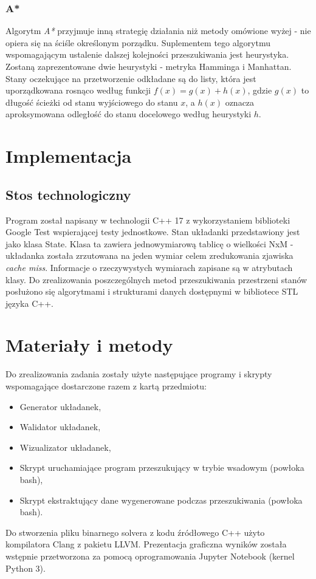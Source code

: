 \documentclass{classrep}
\begin{document}
\subsubsection{A*}
Algorytm \emph{A*} przyjmuje inną strategię działania niż metody
omówione wyżej - nie opiera się na ściśle określonym porządku. Suplementem tego
algorytmu wspomagającym ustalenie dalszej kolejności przeszukiwania jest heurystyka.
Zostaną zaprezentowane dwie heurystyki - metryka Hamminga i Manhattan.
Stany oczekujące na przetworzenie odkładane są do listy, która jest uporządkowana
rosnąco według funkcji $ f(x) = g(x) + h(x) $, gdzie $ g(x) $ to długość ścieżki
od stanu wyjściowego do stanu $ x $, a $ h(x) $ oznacza aproksymowana odległość
do stanu docelowego według heurystyki $ h $.

\section{Implementacja}
\subsection{Stos technologiczny}

Program został napisany w technologii C++ 17 z wykorzystaniem biblioteki
Google Test wspierającej testy jednostkowe. Stan układanki przedstawiony
jest jako klasa State. Klasa ta zawiera jednowymiarową tablicę o
wielkości NxM - układanka została zrzutowana na jeden wymiar celem
zredukowania zjawiska \emph{cache miss}. Informacje o rzeczywystych
wymiarach zapisane są w atrybutach klasy. Do zrealizowania
poszczególnych metod przeszukiwania przestrzeni stanów posłużono się
algorytmami i strukturami danych dostępnymi w bibliotece STL języka C++.

\section{Materiały i metody}
Do zrealizowania zadania zostały użyte następujące programy i skrypty wspomagające dostarczone razem z kartą
przedmiotu:
\begin{itemize}
  \item
    Generator układanek,
  \item
    Walidator układanek,
  \item
    Wizualizator układanek,
  \item
    Skrypt uruchamiające program przeszukujący w trybie wsadowym (powłoka bash),
  \item
    Skrypt ekstraktujący dane wygenerowane podczas przeszukiwania (powłoka bash).
\end{itemize}
Do stworzenia pliku binarnego solvera z kodu źródłowego C++ użyto kompilatora Clang z pakietu LLVM.
Prezentacja graficzna wyników została wstępnie przetworzona za pomocą oprogramowania Jupyter Notebook (kernel
Python 3).
\end{document}
